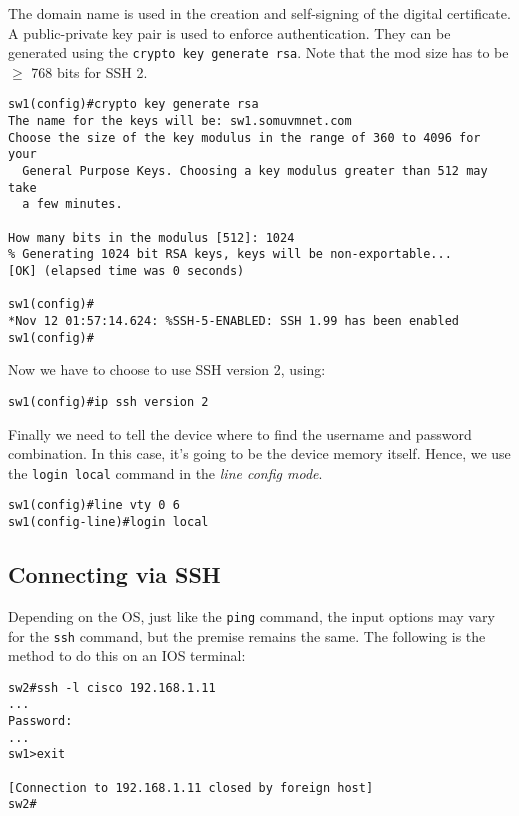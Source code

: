 \noindent
The domain name is used in the creation and self-signing of the digital certificate. A public-private key pair is used to enforce authentication. They can be generated using the \verb|crypto key generate rsa|. Note that the mod size has to be $\geq$ 768 bits for SSH 2. 

\vspace{-15pt}
\begin{verbatim}
sw1(config)#crypto key generate rsa
The name for the keys will be: sw1.somuvmnet.com
Choose the size of the key modulus in the range of 360 to 4096 for your
  General Purpose Keys. Choosing a key modulus greater than 512 may take
  a few minutes.

How many bits in the modulus [512]: 1024
% Generating 1024 bit RSA keys, keys will be non-exportable...
[OK] (elapsed time was 0 seconds)

sw1(config)#
*Nov 12 01:57:14.624: %SSH-5-ENABLED: SSH 1.99 has been enabled
sw1(config)#
\end{verbatim}
\vspace{-10pt}

\noindent
Now we have to choose to use SSH version 2, using: 

\vspace{-15pt}
\begin{verbatim}
sw1(config)#ip ssh version 2
\end{verbatim}
\vspace{-10pt}

\noindent
Finally we need to tell the device where to find the username and password combination. In this case, it's going to be the device memory itself. Hence, we use the \verb|login local| command in the \textit{line config mode}. 

\vspace{-15pt}
\begin{verbatim}
sw1(config)#line vty 0 6
sw1(config-line)#login local
\end{verbatim}
\vspace{-10pt}

\subsection{Connecting via SSH}
Depending on the OS, just like the \verb|ping| command, the input options may vary for the \verb|ssh| command, but the premise remains the same. The following is the method to do this on an IOS terminal: 

\vspace{-15pt}
\begin{verbatim}
sw2#ssh -l cisco 192.168.1.11
...
Password:
...
sw1>exit

[Connection to 192.168.1.11 closed by foreign host]
sw2#
\end{verbatim}
\vspace{-10pt}


